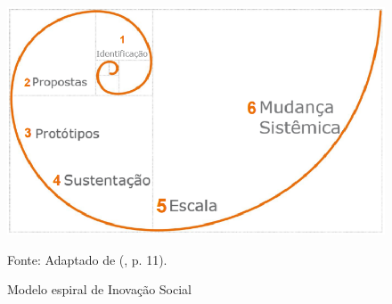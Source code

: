 \begin{figure}[H]
    \caption{Modelo espiral de Inovação Social}
    \centering
    \includegraphics[width=\linewidth]{images/fundamentacao/modelomurray.png}
    \label{fig:modelomurray}
    
    Fonte: Adaptado de \citeauthor{murray2010} (\citeyear{murray2010}, p. 11).
\end{figure}